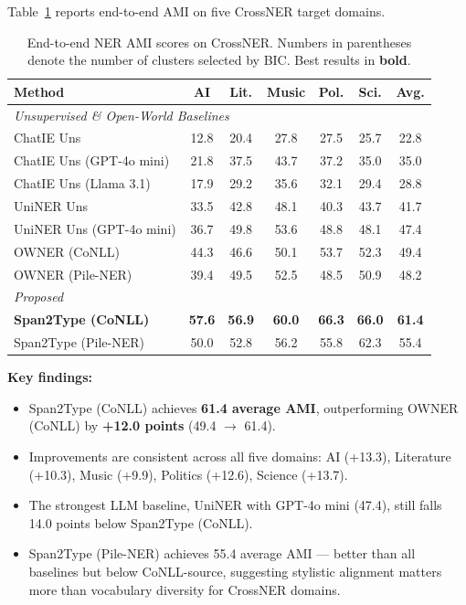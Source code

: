 \documentclass[11pt,a4paper]{article}
\begin{document}
Table~\ref{tab:ner} reports end-to-end AMI on five CrossNER target domains.

\begin{table}[H]
\centering
\footnotesize
\caption{End-to-end NER AMI scores on CrossNER. Numbers in parentheses denote the number of clusters selected by BIC. Best results in \textbf{bold}.}
\label{tab:ner}
\begin{tabular}{l|c|c|c|c|c|c}
\toprule
\textbf{Method} & \textbf{AI} & \textbf{Lit.} & \textbf{Music} & \textbf{Pol.} & \textbf{Sci.} & \textbf{Avg.} \\
\midrule
\multicolumn{7}{l}{\textit{Unsupervised \& Open-World Baselines}} \\
\midrule
ChatIE Uns                   & 12.8 & 20.4 & 27.8 & 27.5 & 25.7 & 22.8 \\
ChatIE Uns (GPT-4o mini)     & 21.8 & 37.5 & 43.7 & 37.2 & 35.0 & 35.0 \\
ChatIE Uns (Llama 3.1)       & 17.9 & 29.2 & 35.6 & 32.1 & 29.4 & 28.8 \\
UniNER Uns                   & 33.5 & 42.8 & 48.1 & 40.3 & 43.7 & 41.7 \\
UniNER Uns (GPT-4o mini)     & 36.7 & 49.8 & 53.6 & 48.8 & 48.1 & 47.4 \\
OWNER (CoNLL)                & 44.3 & 46.6 & 50.1 & 53.7 & 52.3 & 49.4 \\
OWNER (Pile-NER)             & 39.4 & 49.5 & 52.5 & 48.5 & 50.9 & 48.2 \\
\midrule
\multicolumn{7}{l}{\textit{Proposed}} \\
\midrule
\textbf{Span2Type (CoNLL)}   & \textbf{57.6} & \textbf{56.9} & \textbf{60.0} & \textbf{66.3} & \textbf{66.0} & \textbf{61.4} \\
Span2Type (Pile-NER)         & 50.0 & 52.8 & 56.2 & 55.8 & 62.3 & 55.4 \\
\bottomrule
\end{tabular}
\end{table}

\textbf{Key findings:}
\begin{itemize}[noitemsep]
  \item Span2Type (CoNLL) achieves \textbf{61.4 average AMI}, outperforming OWNER (CoNLL) by \textbf{+12.0 points} (49.4 $\to$ 61.4).
  \item Improvements are consistent across all five domains: AI (+13.3), Literature (+10.3), Music (+9.9), Politics (+12.6), Science (+13.7).
  \item The strongest LLM baseline, UniNER with GPT-4o mini (47.4), still falls 14.0 points below Span2Type (CoNLL).
  \item Span2Type (Pile-NER) achieves 55.4 average AMI — better than all baselines but below CoNLL-source, suggesting stylistic alignment matters more than vocabulary diversity for CrossNER domains.
\end{itemize}
\end{document}
